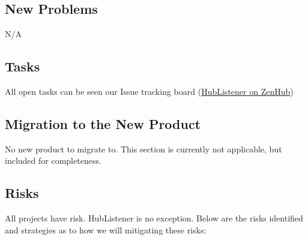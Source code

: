 \documentclass{article}
\begin{document}
\subsection{New Problems}

N/A

\subsection{Tasks}
All open tasks can be seen our Issue tracking board (\href{ https://app.zenhub.com/workspaces/hublistener-5bad6c4d4b5806bc2bea488f/boards?repos=150634456}{HubListener on ZenHub})
\subsection{Migration to the New Product}

No new product to migrate to. This section is currently not applicable, but included for completeness. 
\subsection{Risks}

All projects have risk. HubListener is no exception. Below are the risks identified and strategies as to how we will mitigating these risks:
\end{document}

